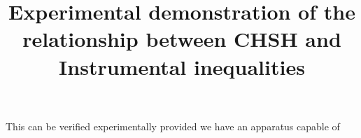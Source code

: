\documentclass{article}
\title{Experimental demonstration of the relationship between CHSH and Instrumental inequalities}
\begin{document}
This can be verified experimentally provided we have an apparatus capable of
\end{document}
